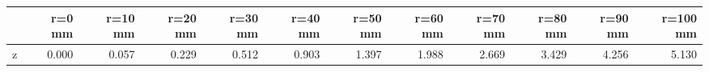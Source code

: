 \documentclass[convert={convertexe={magick.exe}}]{standalone}
\begin{document}
\begin{tabular}{lrrrrrrrrrrr}
\toprule
{} &  r=0 mm &  r=10 mm &  r=20 mm &  r=30 mm &  r=40 mm &  r=50 mm &  r=60 mm &  r=70 mm &  r=80 mm &  r=90 mm &  r=100 mm \\
\midrule
z &   0.000 &    0.057 &    0.229 &    0.512 &    0.903 &    1.397 &    1.988 &    2.669 &    3.429 &    4.256 &     5.130 \\
\bottomrule
\end{tabular}
\end{document}
